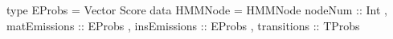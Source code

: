 type EProbs = Vector Score
data HMMNode = HMMNode { nodeNum :: Int
                       , matEmissions :: EProbs
                       , insEmissions :: EProbs
                       , transitions  :: TProbs
                       }
